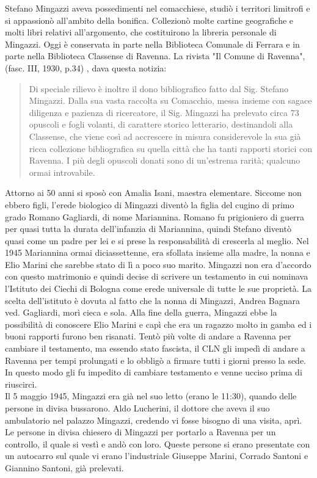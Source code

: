 Stefano Mingazzi aveva possedimenti nel comacchiese, studiò i territori limitrofi e si appassionò all'ambito della bonifica. Collezionò molte cartine geografiche e molti libri relativi all'argomento, che costituirono la libreria personale di Mingazzi. Oggi è conservata in parte nella Biblioteca Comunale di Ferrara e in parte nella Biblioteca Classense di Ravenna. La rivista "Il Comune di Ravenna", (fasc. III, 1930, p.34) , dava questa notizia:
\begin{quotation}
  Di speciale rilievo è inoltre il dono bibliografico fatto dal Sig. Stefano Mingazzi. Dalla sua vasta raccolta su Comacchio, messa insieme con sagace diligenza e pazienza di ricercatore, il Sig. Mingazzi ha prelevato circa 73 opuscoli e fogli volanti, di carattere storico letterario, destinandoli alla Classense, che viene così ad accrescere in misura considerevole la sua già ricca collezione bibliografica su quella città che ha tanti rapporti storici con Ravenna. I più degli opuscoli donati sono di un'estrema rarità; qualcuno ormai introvabile.
\end{quotation}
Attorno ai 50 anni si sposò con Amalia Isani, maestra elementare. Siccome non ebbero figli, l'erede biologico di Mingazzi diventò la figlia del cugino di primo grado  Romano Gagliardi, di nome Mariannina. Romano fu prigioniero di guerra per quasi tutta la durata dell'infanzia di Mariannina, quindi Stefano diventò quasi come un padre per lei e si prese la responsabilità di crescerla al meglio. Nel 1945 Mariannina ormai diciassettenne, era sfollata insieme alla madre, la nonna e Elio Marini che sarebbe stato di lì a poco suo marito. Mingazzi non era d'accordo con questo matrimonio e quindi decise di scrivere un testamento in cui nominava l'Istituto dei Ciechi di Bologna come erede universale di tutte le sue proprietà. La scelta dell'istituto è dovuta al fatto che la nonna di Mingazzi, Andrea Bagnara ved. Gagliardi, morì cieca e sola. Alla fine della guerra, Mingazzi ebbe la possibilità di conoscere Elio Marini e capì che era un ragazzo molto in gamba ed i buoni rapporti furono ben risanati. Tentò più volte di andare a Ravenna per cambiare il testamento, ma essendo stato fascista, il CLN gli impedì di andare a Ravenna per tempi prolungati e lo obbligò a firmare tutti i giorni presso la sede. In questo modo gli fu impedito di cambiare testamento e venne ucciso prima di riuscirci.\\

Il 5 maggio 1945, Mingazzi era già nel suo letto (erano le 11:30), quando delle persone in divisa bussarono. Aldo Lucherini, il dottore che aveva il suo ambulatorio nel palazzo Mingazzi, credendo vi fosse bisogno di una visita, aprì. Le persone in divisa chiesero di Mingazzi per portarlo a Ravenna per un controllo, il quale si vestì e andò con loro. Queste persone si erano presentate con un autocarro sul quale vi erano l'industriale Giuseppe Marini, Corrado Santoni e Giannino Santoni, già prelevati.\\

